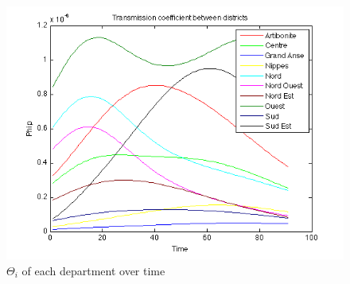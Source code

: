 \documentclass[11pt]{article}
\begin{document}
\begin{figure}
  \begin{minipage}[t]{\textwidth}
    \centering
    \includegraphics[width=\textwidth]{Bilder/coeff.png} 
    \caption{$\Theta_{i}$ of each department over time}
	\label{fig:coeff}
  \end{minipage}
\end{figure}
\end{document}
